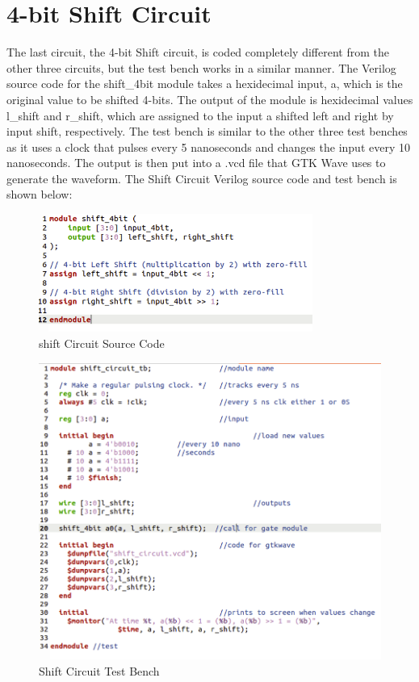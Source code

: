 \documentclass[runningheads, 12pt]{report}
\begin{document}
\pagebreak

	\section{4-bit Shift Circuit}

The last circuit, the 4-bit Shift circuit, is coded completely different from the other three circuits, but the test bench works in a similar manner. The Verilog source code for the shift\_4bit module takes a hexidecimal input, a, which is the original  value to be shifted 4-bits. The output of the module is hexidecimal values l\_shift and r\_shift, which are assigned to the input a shifted left and right by input shift, respectively. The test bench is similar to the other three test benches as it uses a clock that pulses every 5 nanoseconds and changes the input every 10 nanoseconds. The output is then put into a .vcd file that GTK Wave uses to generate the waveform. The Shift Circuit Verilog source code and test bench is shown below:

\begin{figure}[h]
	\centering
	\includegraphics[width=0.8\textwidth]{shift_sc}
	\caption{shift Circuit Source Code}
	\label{fig: shift_sc}
\end{figure}

\begin{figure}[h]
	\centering
	\includegraphics[width=1.0\textwidth]{shift_test}
	\caption{Shift Circuit Test Bench}
	\label{fig: shift_test}
\end{figure}	
\end{document}
